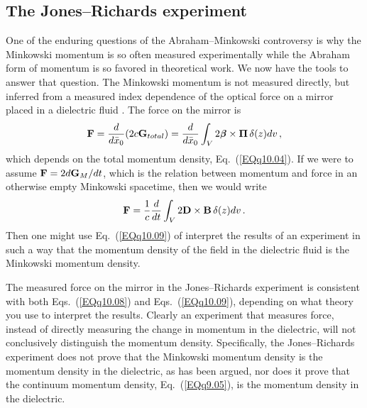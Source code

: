 \documentclass[twocolumn,amssymb,eqsecnum,aps,pra]{revtex4-2}
\begin{document}
\subsection{The Jones--Richards experiment}
\par
One of the enduring questions of the Abraham--Minkowski controversy is
why the Minkowski momentum is so often measured experimentally while
the Abraham form of momentum is so favored in theoretical work.
We now have the tools to answer that question.
The Minkowski momentum is not measured directly, but inferred from a
measured index dependence of the optical force on a mirror placed in a
dielectric fluid \cite{BIPfei,BIBarnLou,BIExp}.
The force on the mirror is
\begin{equation}
{\bf F} = \frac{d}{d\bar x_0}(2c{\bf G}_{total})
=\frac{d}{d\bar x_0}\int_V
2{{\beta}\hskip -5.6pt {\beta}}\times{\bf \Pi} \, \delta (z)dv \, ,
\label{EQq10.08}
\end{equation}
which depends on the total momentum density, Eq.~(\ref{EQq10.04}).
If we were to assume ${\bf F}=2d{\bf G}_M/dt$, which is the relation
between momentum and force in an otherwise empty Minkowski spacetime,
then we would write 
\begin{equation}
{\bf F} = \frac{1}{c}\frac{d}{dt}\int_V
{2{\bf D}\times {\bf B}} \, \delta (z) dv \, .
\label{EQq10.09}
\end{equation}
Then one might use Eq.~(\ref{EQq10.09}) of interpret the results of
an experiment in such a way that the momentum density of the field
in the dielectric fluid is the Minkowski momentum density.
\par
The measured force on the mirror in the Jones--Richards
experiment \cite{BIExp}
is consistent with both Eqs.~(\ref{EQq10.08}) and Eqs.~(\ref{EQq10.09}),
depending on what theory you use to interpret the results.
Clearly an experiment that measures force, instead of directly
measuring the change in momentum in the dielectric, will not
conclusively distinguish the momentum density.
Specifically, the Jones--Richards experiment does not prove that the
Minkowski momentum density is the momentum density in the dielectric,
as has been argued, nor does it prove that the continuum momentum
density, Eq.~(\ref{EQq9.05}), is the momentum density in the dielectric.
\par
\end{document}
